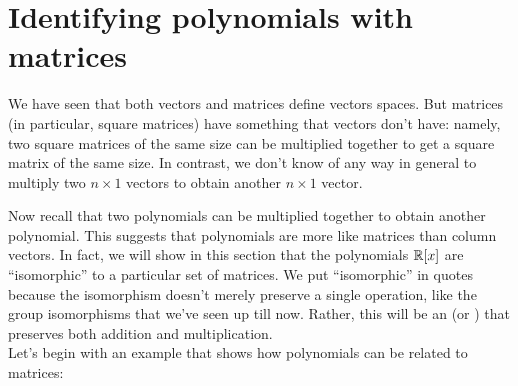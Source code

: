 \section{Identifying polynomials with matrices}
\label{sec:ExploringPolynomials:IdentifyingPolynomialsMatrices}

We have seen that both vectors and matrices define vectors spaces.  But matrices (in particular, square matrices) have something that vectors don't have: namely, two square matrices of the same size can be multiplied together to get a square matrix of the same size.  In contrast, we don't know of any way in general to multiply two $n \times 1$ vectors to obtain another $n \times 1$ vector. 

Now recall that two polynomials can be multiplied together to obtain another polynomial. This suggests that polynomials are more like matrices than column vectors. In fact, we will show in this section that the polynomials $\mathbb{R}[x]$ are ``isomorphic'' to a particular set of matrices.  We put ``isomorphic'' in quotes because the isomorphism doesn't merely preserve a single operation, like the group isomorphisms  that we've seen up till now. Rather, this will be an  (or ) that preserves both addition and multiplication.\\
Let's begin with an example that shows how polynomials can be related to matrices:

